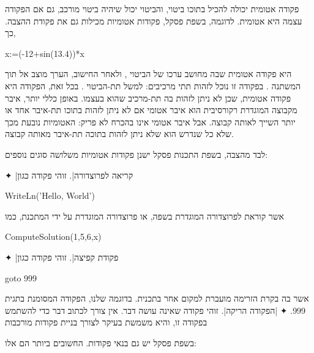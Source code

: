 פקודה אטומית יכולה להכיל בתוכו ביטוי, והביטוי יכול שיהיה ביטוי מורכב, גם אם
הפקודה עצמה היא אטומית.
לדוגמה, בשפת פסקל, פקודות אטומיות מכילות גם את פקודת ההצבה. כך,
\begin{PASCAL}
x:=(-12+sin(13.4))*x
\end{PASCAL}
היא פקודה אטומית שבה מחושב ערכו של הביטוי ,
ולאחר החישוב, הערך מוצב אל תוך המשתנה .
בפקודה זו נוכל לזהות תתי מרכיבים: למשל תת-הביטוי .
 בכל זאת, הפקודה היא פקודה אטומית, שכן לא ניתן לזהות בה תת-מרכיב שהוא 
 בעצמו. באופן כללי יותר, איבר מקבוצה המוגדרת רקורסיבית הוא איבר אטומי אם
לא ניתן לזהות בתוכו תת-איבר אחד או יותר השייך לאותה קבוצה. אבל איבר אטומי אינו
בהכרח לא פריק: האטומיות נובעת מכך שלא כל שנדרש הוא שלא ניתן לזהות בתוכה תת-איבר
מאותה קבוצה.

לבד מהצבה, בשפת התכנות פסקל ישנן פקודות אטומיות משלושה סוגים נוספים:
\begin{enumerate}
✦ \ע|קריאה לפרוצדורה|. זוהי פקודה כגון
\begin{PASCAL}
WriteLn('Hello, World')
\end{PASCAL}
אשר קוראת לפרוצדורה המוגדרת בשפה, או פרוצדורה המוגדרת על ידי המתכנת, כמו
\begin{PASCAL}
ComputeSolution(1,5,6,x)
\end{PASCAL}
✦ \ע|פקודת קפיצה|. זוהי פקודה כגון
\begin{PASCAL}
goto 999
\end{PASCAL}
אשר בה בקרת הזרימה מועברת למקום אחר בתכנית. בדוגמה שלנו, הפקודה המסומנת בתגית
999.
✦ \ע|הפקודה הריקה|. זוהי פקודה שאינה עושה דבר. אין צורך לכתוב דבר כדי
להשתמש בפקודה זו, והיא משמשת בעיקר לצורך בניית פקודות מורכבות
\end{enumerate}
בשפת פסקל יש גם בנאי פקודות. החשובים ביותר הם אלו:
